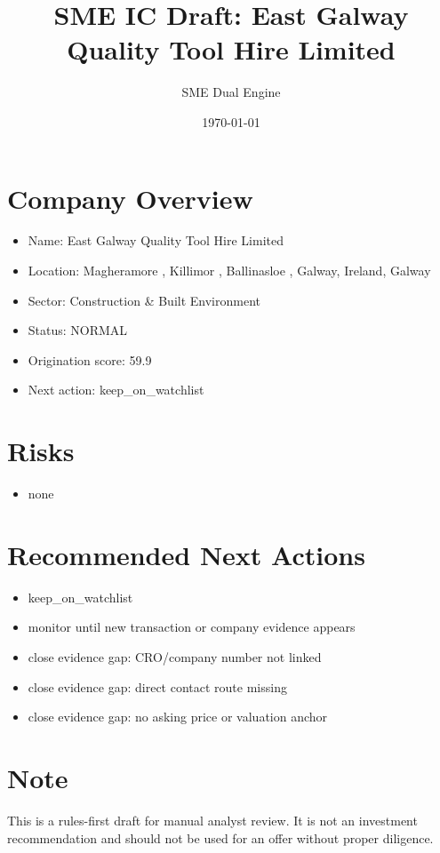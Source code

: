 \documentclass[11pt,a4paper]{article}
\title{SME IC Draft: East Galway Quality Tool Hire Limited}
\author{SME Dual Engine}
\date{\today}
\begin{document}
\maketitle
\section*{Company Overview}
\begin{itemize}[leftmargin=1.4em]
\item Name: East Galway Quality Tool Hire Limited
\item Location: Magheramore , Killimor , Ballinasloe , Galway, Ireland, Galway
\item Sector: Construction \& Built Environment
\item Status: NORMAL
\item Origination score: 59.9
\item Next action: keep\_on\_watchlist
\end{itemize}
\section*{Risks}
\begin{itemize}[leftmargin=1.4em]
\item none
\end{itemize}
\section*{Recommended Next Actions}
\begin{itemize}[leftmargin=1.4em]
\item keep\_on\_watchlist
\item monitor until new transaction or company evidence appears
\item close evidence gap: CRO/company number not linked
\item close evidence gap: direct contact route missing
\item close evidence gap: no asking price or valuation anchor
\end{itemize}
\section*{Note}
This is a rules-first draft for manual analyst review. It is not an investment
recommendation and should not be used for an offer without proper diligence.
\end{document}
